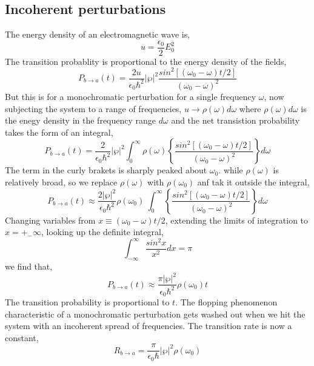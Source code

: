 \subsection{Incoherent perturbations}
The energy density of an electromagnetic wave is,
\begin{equation}
	u=\frac{\epsilon_0}{2}E^2_0
\end{equation}	
The transition probablity is proportional to the energy density of the fields,
\begin{equation}
	P_{b\rightarrow a}(t)=\frac{2u}{\epsilon_0\hbar^2}|\wp|^2\frac{sin^2[(\omega_0-\omega) t/2]}{(\omega_0-\omega)^2}
\end{equation}
But this is for a monochromatic perturbation for a single frequency $\omega$, now subjecting the system to a range of frequencies, $u\rightarrow\rho(\omega)d\omega$ where $\rho(\omega)d\omega$ is the enegy density in the frequency range $d\omega$ and the net transistion probability takes the form of an integral,
\begin{equation}
	P_{b\rightarrow a}(t)=\frac{2}{\epsilon_0\hbar^2}|\wp|^2 \int_{0}^{\infty}\rho(\omega)\left\{\frac{sin^2[(\omega_0-\omega) t/2]}{(\omega_0-\omega)^2}\right\}d\omega
\end{equation}	
The term in the curly brakets is sharply peaked about $\omega_0$. while $\rho(\omega)$ is relatively broad, so we replace $\rho(\omega)$ with $\rho(\omega_0)$ anf tak it outside the integral,
\begin{equation}
	P_{b\rightarrow a}(t)\approx\frac{2|\wp|^2}{\epsilon_0\hbar^2}\rho(\omega_0)\ \int_{0}^{\infty}\left\{\frac{sin^2[(\omega_0-\omega) t/2]}{(\omega_0-\omega)^2}\right\}d\omega
\end{equation}
Changing variables from $x\equiv(\omega_0-\omega)t/2$, extending the limits of integration to $x=+_-\infty$, looking up the definite integral,
\begin{equation*}
	\int_{-\infty}^{\infty}\frac{sin^2x}{x^2}dx=\pi
\end{equation*}
we find that,
\begin{equation}
	P_{b\rightarrow a}(t)\approx\frac{\pi|\wp|^2}{\epsilon_0\hbar^2}\rho(\omega_0)t
\end{equation}	
The transition probability is proportional to $t$. The flopping phenomenon characteristic of a monochromatic perturbation gets washed out when we hit the system with an incoherent spread of frequencies. The transition rate 
is now a constant,
\begin{equation}
	R_{b\rightarrow a}=\frac{\pi}{\epsilon_0\hbar}|\wp|^2\rho(\omega_0)
\end{equation}	
